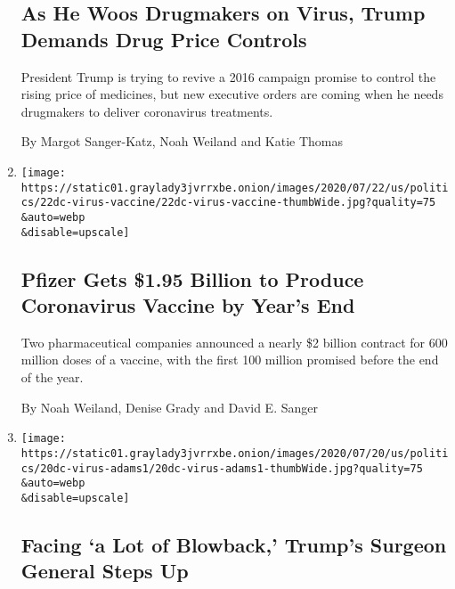 \begin{enumerate}
  \hypertarget{as-he-woos-drugmakers-on-virus-trump-demands-drug-price-controls}{%
  \subsection{As He Woos Drugmakers on Virus, Trump Demands Drug Price
  Controls}\label{as-he-woos-drugmakers-on-virus-trump-demands-drug-price-controls}}

  President Trump is trying to revive a 2016 campaign promise to control
  the rising price of medicines, but new executive orders are coming
  when he needs drugmakers to deliver coronavirus treatments.

  By Margot Sanger-Katz, Noah Weiland and Katie Thomas
\item
  \href{/2020/07/22/us/politics/pfizer-coronavirus-vaccine.html}{}

  \texttt{[image: https://static01.graylady3jvrrxbe.onion/images/2020/07/22/us/politics/22dc-virus-vaccine/22dc-virus-vaccine-thumbWide.jpg?quality=75\\\&auto=webp\\\&disable=upscale]}

  \hypertarget{pfizer-gets-195-billion-to-produce-coronavirus-vaccine-by-years-end}{%
  \subsection{Pfizer Gets \$1.95 Billion to Produce Coronavirus Vaccine
  by Year's
  End}\label{pfizer-gets-195-billion-to-produce-coronavirus-vaccine-by-years-end}}

  Two pharmaceutical companies announced a nearly \$2 billion contract
  for 600 million doses of a vaccine, with the first 100 million
  promised before the end of the year.

  By Noah Weiland, Denise Grady and David E. Sanger
\item
  \href{/2020/07/21/us/politics/jerome-adams-surgeon-general-trump-coronavirus.html}{}

  \texttt{[image: https://static01.graylady3jvrrxbe.onion/images/2020/07/20/us/politics/20dc-virus-adams1/20dc-virus-adams1-thumbWide.jpg?quality=75\\\&auto=webp\\\&disable=upscale]}

  \hypertarget{facing-a-lot-of-blowback-trumps-surgeon-general-steps-up}{%
  \subsection{Facing `a Lot of Blowback,' Trump's Surgeon General Steps
  Up}\label{facing-a-lot-of-blowback-trumps-surgeon-general-steps-up}}


\end{enumerate}
